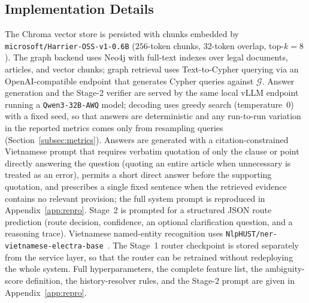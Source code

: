 \subsection{Implementation Details}\label{subsec:implementation}

The Chroma vector store is persisted with chunks embedded by
\texttt{microsoft/Harrier-OSS-v1-0.6B} ($256$-token chunks, $32$-token
overlap, top-$k=8$). The graph backend uses Neo4j with full-text indexes over
legal documents, articles, and vector chunks; graph retrieval uses
Text-to-Cypher querying via an OpenAI-compatible endpoint that generates
Cypher queries against $\mathcal{G}$. Answer generation and the Stage-2
verifier are served by the same local vLLM endpoint running a
\texttt{Qwen3-32B-AWQ} model; decoding uses greedy search (temperature~$0$)
with a fixed seed, so that answers are deterministic and any run-to-run
variation in the reported metrics comes only from resampling queries
(Section~\ref{subsec:metrics}).
Answers are generated with a citation-constrained Vietnamese prompt that
requires verbatim quotation of only the clause or point directly answering
the question (quoting an entire article when unnecessary is treated as an
error), permits a short direct answer before the supporting quotation, and
prescribes a single fixed sentence when the retrieved evidence contains no
relevant provision; the full system prompt is reproduced in
Appendix~\ref{app:repro}. Stage~2 is prompted for a structured JSON route
prediction (route decision, confidence, an optional clarification question,
and a reasoning trace).
Vietnamese named-entity recognition uses
\texttt{NlpHUST/ner-vietnamese-electra-base}~\cite{clark2020electra}. The
Stage~1 router checkpoint is stored separately from the service layer, so
that the router can be retrained without redeploying the whole system. Full
hyperparameters, the complete feature list, the ambiguity-score definition,
the history-resolver rules, and the Stage-2 prompt are given in
Appendix~\ref{app:repro}.